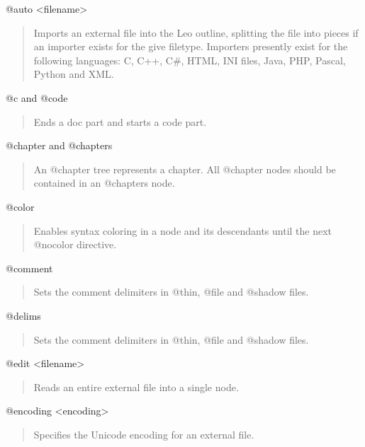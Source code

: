 \documentclass[a4paper,10pt,english]{sphinxmanual}
\begin{document}
@auto \textless{}filename\textgreater{}
\begin{quote}

Imports an external file into the Leo outline, splitting the file into
pieces if an importer exists for the give filetype. Importers presently
exist for the following languages: C, C++, C\#, HTML, INI files, Java, PHP,
Pascal, Python and XML.
\end{quote}

@c and @code
\begin{quote}

Ends a doc part and starts a code part.
\end{quote}

@chapter and @chapters
\begin{quote}

An @chapter tree represents a chapter. All @chapter nodes should be
contained in an @chapters node.
\end{quote}

@color
\begin{quote}

Enables syntax coloring in a node and its descendants until the next
@nocolor directive.
\end{quote}

@comment
\begin{quote}

Sets the comment delimiters in @thin, @file and @shadow files.
\end{quote}

@delims
\begin{quote}

Sets the comment delimiters in @thin, @file and @shadow files.
\end{quote}

@edit \textless{}filename\textgreater{}
\begin{quote}

Reads an entire external file into a single node.
\end{quote}

@encoding \textless{}encoding\textgreater{}
\begin{quote}

Specifies the Unicode encoding for an external file.
\end{quote}
\end{document}
